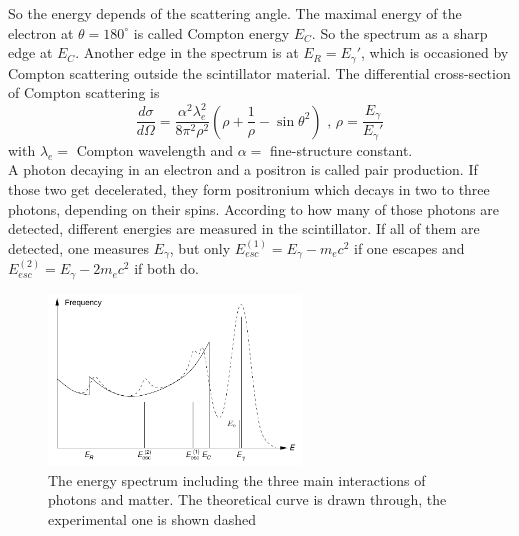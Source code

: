 \documentclass{article}
\begin{document}
So the energy depends of the scattering angle. The maximal energy of the electron at $\theta = 180^\circ$ is called Compton energy $E_C$.
So the spectrum as a sharp edge at $E_C$. 
Another edge in the spectrum is at $E_R = E_\gamma'$, which is occasioned by Compton scattering outside the scintillator material.
The differential cross-section of Compton scattering is
\begin{equation}
    \frac{d\sigma}{d\Omega} = \frac{\alpha^2\lambda_e^2}{8\pi^2\rho^2}(\rho+\frac{1}{\rho}-\sin{\theta}^2) \mbox{ , } \rho = \frac{E_\gamma}{E_\gamma'}
    \label{diff_theo}
\end{equation}
with $\lambda_e =$ Compton wavelength and $\alpha =$ fine-structure constant.\\
A photon decaying in an electron and a positron is called pair production. 
If those two get decelerated, they form positronium which decays in two to three photons, depending on their spins.
According to how many of those photons are detected, different energies are measured in the scintillator. 
If all of them are detected, one measures $E_\gamma$, but only $E_{esc}^{(1)} = E_\gamma-m_ec^2$ if one escapes and $E_{esc}^{(2)} = E_\gamma-2m_ec^2$ if both do.
    \begin{figure}[H]
       \centering
        \includegraphics[width=0.6\textwidth]{Bilder/spectrum.png}
        \caption{The energy spectrum including the three main interactions of photons and matter. The theoretical curve is drawn through, the experimental one is shown dashed\footnotemark}
        \label{spec_pic}
    \end{figure}
\end{document}
